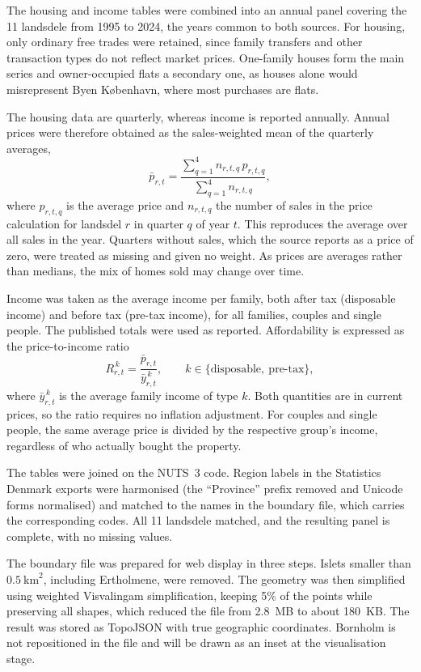 The housing and income tables were combined into an annual panel covering the 11 landsdele from 1995 to 2024, the years common to both sources. 
For housing, only ordinary free trades were retained, since family transfers and other transaction types do not reflect market prices. 
One-family houses form the main series and owner-occupied flats a secondary one, as houses alone would misrepresent Byen København, where most purchases are flats.

The housing data are quarterly, whereas income is reported annually. 
Annual prices were therefore obtained as the sales-weighted mean of the quarterly averages,
\begin{equation}
  \bar{p}_{r,t} = \frac{\sum_{q=1}^{4} n_{r,t,q}\, p_{r,t,q}}{\sum_{q=1}^{4} n_{r,t,q}},
\end{equation}
where $p_{r,t,q}$ is the average price and $n_{r,t,q}$ the number of sales in the price calculation for landsdel $r$ in quarter $q$ of year $t$. 
This reproduces the average over all sales in the year. 
Quarters without sales, which the source reports as a price of zero, were treated as missing and given no weight. 
As prices are averages rather than medians, the mix of homes sold may change over time.

Income was taken as the average income per family, both after tax (disposable income) and before tax (pre-tax income), for all families, couples and single people. 
The published totals were used as reported. 
Affordability is expressed as the price-to-income ratio
\begin{equation}
  R^{\,k}_{r,t} = \frac{\bar{p}_{r,t}}{\bar{y}^{\,k}_{r,t}}, \qquad k \in \{\text{disposable},\ \text{pre-tax}\},
\end{equation}
where $\bar{y}^{\,k}_{r,t}$ is the average family income of type $k$. 
Both quantities are in current prices, so the ratio requires no inflation adjustment. 
For couples and single people, the same average price is divided by the respective group's income, regardless of who actually bought the property.

The tables were joined on the NUTS~3 code. 
Region labels in the Statistics Denmark exports were harmonised (the ``Province'' prefix removed and Unicode forms normalised) and matched to the names in the boundary file, which carries the corresponding codes. 
All 11 landsdele matched, and the resulting panel is complete, with no missing values.

The boundary file was prepared for web display in three steps. 
Islets smaller than $0.5~\text{km}^2$, including Ertholmene, were removed. 
The geometry was then simplified using weighted Visvalingam simplification, keeping 5\% of the points while preserving all shapes, which reduced the file from 2.8~MB to about 180~KB. 
The result was stored as TopoJSON with true geographic coordinates. 
Bornholm is not repositioned in the file and will be drawn as an inset at the visualisation stage.

